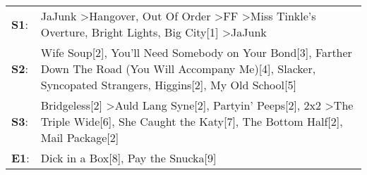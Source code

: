 \begin{supertabular}{p{0.03\textwidth}p{0.92\textwidth}}
 \textbf{S1}:  &                                                JaJunk\textsuperscript{} \textgreater \enspace Hangover\textsuperscript{}, \enspace Out Of Order\textsuperscript{} \textgreater \enspace FF\textsuperscript{} \textgreater \enspace Miss Tinkle's Overture\textsuperscript{}, \enspace Bright Lights, Big City[1]\textsuperscript{} \textgreater \enspace JaJunk\textsuperscript{}  \enspace  \\
 \textbf{S2}:  &                             Wife Soup[2]\textsuperscript{}, \enspace You'll Need Somebody on Your Bond[3]\textsuperscript{}, \enspace Farther Down The Road (You Will Accompany Me)[4]\textsuperscript{}, \enspace Slacker\textsuperscript{}, \enspace Syncopated Strangers\textsuperscript{}, \enspace Higgins[2]\textsuperscript{}, \enspace My Old School[5]\textsuperscript{}  \enspace  \\
 \textbf{S3}:  &  Bridgeless[2]\textsuperscript{} \textgreater \enspace Auld Lang Syne[2]\textsuperscript{}, \enspace Partyin' Peeps[2]\textsuperscript{}, \enspace 2x2\textsuperscript{} \textgreater \enspace The Triple Wide[6]\textsuperscript{}, \enspace She Caught the Katy[7]\textsuperscript{}, \enspace The Bottom Half[2]\textsuperscript{}, \enspace Mail Package[2]\textsuperscript{}  \enspace  \\
 \textbf{E1}:  &                                                                                                                                                                                                                                                                                                  Dick in a Box[8]\textsuperscript{}, \enspace Pay the Snucka[9]\textsuperscript{}  \enspace  \\
\end{supertabular}
